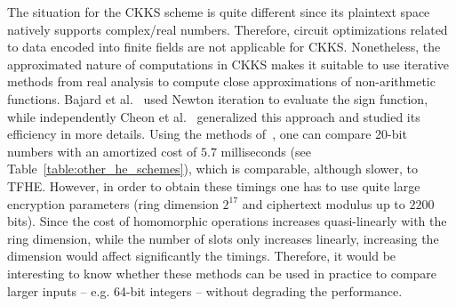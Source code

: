 The situation for the CKKS scheme is quite different since its plaintext space natively supports complex/real numbers. 
Therefore, circuit optimizations related to data encoded into finite fields are not applicable for CKKS. 
Nonetheless, the approximated nature of computations in CKKS makes it suitable to use iterative methods from real analysis to compute close approximations of non-arithmetic functions. 
Bajard et al.~\cite{BMSZ20} used Newton iteration to evaluate the sign function, while independently Cheon et al.~\cite{AC:CKKLL19,EPRINT:CheKimKim19} generalized this approach and studied its efficiency in more details. 
Using the methods of~\cite{EPRINT:CheKimKim19}, one can compare 20-bit numbers with an amortized cost of $5.7$ milliseconds (see Table~\ref{table:other_he_schemes}), which is comparable, although slower, to TFHE. 
However, in order to obtain these timings one has to use quite large encryption parameters (ring dimension $2^{17}$ and ciphertext modulus up to $2200$ bits). 
Since the cost of homomorphic operations increases quasi-linearly with the ring dimension, while the number of slots only increases linearly, increasing the dimension would affect significantly the timings. 
Therefore, it would be interesting to know whether these methods can be used in practice to compare larger inputs -- e.g. 64-bit integers -- without degrading the performance. 




  

